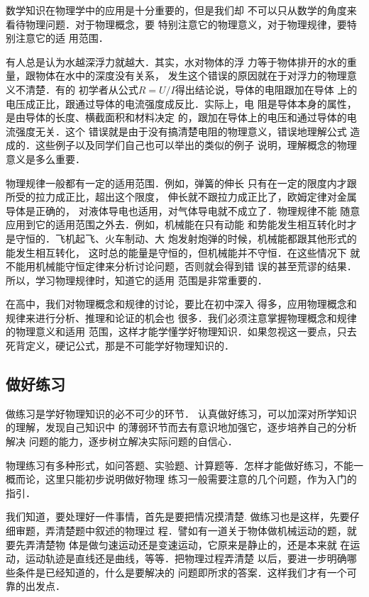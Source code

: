     数学知识在物理学中的应用是十分重要的，但是我们却
不可以只从数学的角度来看待物理问题．对于物理概念，要
特别注意它的物理意义，对于物理规律，要特别注意它的适
用范围．

    有人总是认为水越深浮力就越大．其实，水对物体的浮
力等于物体排开的水的重量，跟物体在水中的深度没有关系，
发生这个错误的原因就在于对浮力的物理意义不清楚．有的
初学者从公式$R=U/I$得出结论说，导体的电阻跟加在导体
上的电压成正比，跟通过导体的电流强度成反比．实际上，电
阻是导体本身的属性，是由导体的长度、横截面积和材料决定
的，跟加在导体上的电压和通过导体的电流强度无关．这个
错误就是由于没有搞清楚电阻的物理意义，错误地理解公式
造成的．这些例子以及同学们自己也可以举出的类似的例子
说明，理解概念的物理意义是多么重要．

    物理规律一般都有一定的适用范围．例如，弹簧的伸长
只有在一定的限度内才跟所受的拉力成正比，超出这个限度，
伸长就不跟拉力成正比了，欧姆定律对金属导体是正确的，
对液体导电也适用，对气体导电就不成立了．物理规律不能
随意应用到它的适用范围之外去．例如，机械能在只有动能
和势能发生相互转化时才是守恒的．飞机起飞、火车制动、大
炮发射炮弹的时候，机械能都跟其他形式的能发生相互转化，
这时总的能量是守恒的，但机械能并不守恒．在这些情况下
就不能用机械能守恒定律来分析讨论问题，否则就会得到错
误的甚至荒谬的结果．所以，学习物理规律时，知道它的适用
范围是非常重要的．

    在高中，我们对物理概念和规律的讨论，要比在初中深入
得多，应用物理概念和规律来进行分析、推理和论证的机会也
很多．我们必须注意掌握物理概念和规律的物理意义和适用
范围，这样才能学懂学好物理知识．如果忽视这一要点，只去
死背定义，硬记公式，那是不可能学好物理知识的．


\subsection*{做好练习}

做练习是学好物理知识的必不可少的环节．
认真做好练习，可以加深对所学知识的理解，发现自己知识中
的薄弱环节而去有意识地加强它，逐步培养自己的分析解决
问题的能力，逐步树立解决实际问题的自信心．

物理练习有多种形式，如问答题、实验题、计算题等．怎样才能做好练习，不能一概而论，这里只能初步说明做好物理
练习一般需要注意的几个问题，作为入门的指引．

    我们知道，要处理好一件事情，首先是要把情况摸清楚.
做练习也是这样，先要仔细审题，弄清楚题中叙述的物理过
程．譬如有一道关于物体做机械运动的题，就要先弄清楚物
体是做匀速运动还是变速运动，它原来是静止的，还是本来就
在运动，运动轨迹是直线还是曲线，等等．把物理过程弄清楚
以后，要进一步明确哪些条件是已经知道的，什么是要解决的
问题即所求的答案．这样我们才有一个可靠的出发点．

